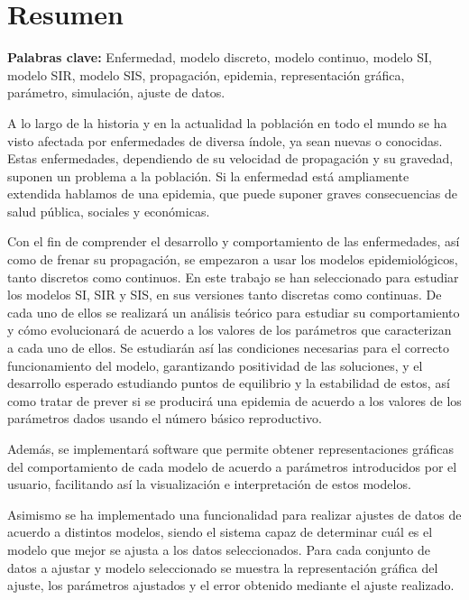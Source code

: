 

\chapter*{Resumen}

\textbf{Palabras clave: } Enfermedad, modelo discreto, modelo continuo, modelo SI, modelo SIR, modelo SIS, propagación, epidemia, representación gráfica, parámetro, simulación, ajuste de datos.

A lo largo de la historia y en la actualidad la población en todo el mundo se ha visto afectada por enfermedades de diversa índole, ya sean nuevas o conocidas. Estas enfermedades, dependiendo de su velocidad de propagación y su gravedad, suponen un problema a la población. Si la enfermedad está ampliamente extendida hablamos de una epidemia, que puede suponer graves consecuencias de salud pública, sociales y económicas.

Con el fin de comprender el desarrollo y comportamiento de las enfermedades, así como de frenar su propagación, se empezaron a usar los modelos epidemiológicos, tanto discretos como continuos. En este trabajo se han seleccionado para estudiar los modelos SI, SIR y SIS, en sus versiones tanto discretas como continuas. De cada uno de ellos se realizará un análisis teórico para estudiar su comportamiento y cómo evolucionará de acuerdo a los valores de los parámetros que caracterizan a cada uno de ellos. Se estudiarán así las condiciones necesarias para el correcto funcionamiento del modelo, garantizando positividad de las soluciones, y el desarrollo esperado estudiando puntos de equilibrio y la estabilidad de estos, así como tratar de prever si se producirá una epidemia de acuerdo a los valores de los parámetros dados usando el número básico reproductivo.

Además, se implementará software que permite obtener representaciones gráficas del comportamiento de cada modelo de acuerdo a parámetros introducidos por el usuario, facilitando así la visualización e interpretación de estos modelos.

Asimismo se ha implementado una funcionalidad para realizar ajustes de datos de acuerdo a distintos modelos, siendo el sistema capaz de determinar cuál es el modelo que mejor se ajusta a los datos seleccionados. Para cada conjunto de datos a ajustar y modelo seleccionado se muestra la representación gráfica del ajuste, los parámetros ajustados y el error obtenido mediante el ajuste realizado.

